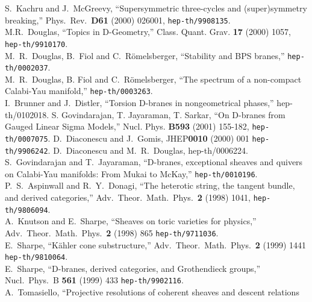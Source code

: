 \documentclass[a4paper,12pt]{article}
\begin{document}
\begin{thebibliography}{99}
S.~Kachru and J.~McGreevy,
``Supersymmetric three-cycles and (super)symmetry breaking,''
Phys.\ Rev.\ {\bf D61} (2000) 026001,
{\tt hep-th/9908135}.\\
M.R.~Douglas, ``Topics in D-Geometry,''
Class. Quant. Grav. {\bf 17} (2000) 1057, {\tt hep-th/9910170}. \\
M.~R.~Douglas, B.~Fiol and C.~R\"omelsberger,
``Stability and BPS branes,'' {\tt hep-th/0002037}. \\
M.~R.~Douglas, B. Fiol and C.~R\"omelsberger, ``The
spectrum
of a non-compact Calabi-Yau manifold,'' {\tt hep-th/0003263}. \\
I.~Brunner and J.~Distler,
``Torsion D-branes in nongeometrical phases,''
hep-th/0102018.
 S. Govindarajan, T. Jayaraman, T. Sarkar, ``On D-branes
from Gauged Linear Sigma Models,'' 
Nucl. Phys. {\bf B593} (2001) 155-182, {\tt hep-th/0007075}. 
D.~Diaconescu and J.~Gomis,
JHEP{\bf 0010} (2000) 001
{\tt hep-th/9906242}.
D.~Diaconescu and M.~R.~Douglas,
hep-th/0006224. 
S.~Govindarajan and T.~Jayaraman,
``D-branes, exceptional sheaves and quivers on Calabi-Yau manifolds:
{}From  Mukai to McKay,'' {\tt hep-th/0010196}.
P.~S.~Aspinwall and R.~Y.~Donagi,
``The heterotic string, the tangent bundle, and derived categories,''
Adv.\ Theor.\ Math.\ Phys.\ {\bf 2} (1998) 1041,
{\tt hep-th/9806094}. \\
A.~Knutson and E.~Sharpe,
``Sheaves on toric varieties for physics,''
Adv.\ Theor.\ Math.\ Phys.\ {\bf 2} (1998) 865
{\tt hep-th/9711036}. \\
E.~Sharpe,
``K\"ahler cone substructure,''
Adv.\ Theor.\ Math.\ Phys.\ {\bf 2} (1999) 1441
{\tt hep-th/9810064}. \\
E.~Sharpe,
``D-branes, derived categories, and Grothendieck groups,''
Nucl.\ Phys.\ B {\bf 561} (1999) 433
{\tt hep-th/9902116}. \\
A.~Tomasiello,
``Projective resolutions of coherent sheaves and descent relations

\end{thebibliography}
\end{document}
